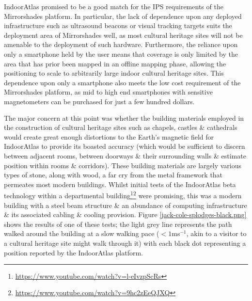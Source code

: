 IndoorAtlas promised to be a good match for the IPS requirements of the Mirrorshades platform. In particular, the lack of dependence upon any deployed infrastructure such as ultrasound beacons or visual tracking targets suits the deployment area of Mirrorshades well, as most cultural heritage sites will not be amenable to the deployment of such hardware. Furthermore, the reliance upon only a smartphone held by the user means that coverage is only limited by the area that has prior been mapped in an offline mapping phase, allowing the positioning to scale to arbitrarily large indoor cultural heritage sites. This dependence upon only a smartphone also meets the low cost requirement of the Mirrorshades platform, as mid to high end smartphones with sensitive magnetometers can be purchased for just a few hundred dollars.

The major concern at this point was whether the building materials employed in the construction of cultural heritage sites such as chapels, castles \& cathedrals would create great enough distortions to the Earth's magnetic field for IndoorAtlas to provide its boasted accuracy (which would be sufficient to discern between adjacent rooms, between doorways \& their surrounding walls \& estimate position within rooms \& corridors). These building materials are largely various types of stone, along with wood, a far cry from the metal framework that permeates most modern buildings. Whilst initial tests of the IndoorAtlas beta technology within a departmental building\footnote{\url{https://www.youtube.com/watch?v=l-eIvzpScRs}}\footnote{\url{https://www.youtube.com/watch?v=9hc2zEeQJXQ}} were promising, this was a modern building with a steel beam structure \& an abundance of computing infrastructure \& its associated cabling \& cooling provision. Figure \ref{jack-cole-splodges-black.png} shows the results of one of these tests; the light grey line represents the path walked around the building at a slow walking pace ($<1$ms$^{-1}$, akin to a visitor to a cultural heritage site might walk through it) with each black dot representing a position reported by the IndoorAtlas platform.

